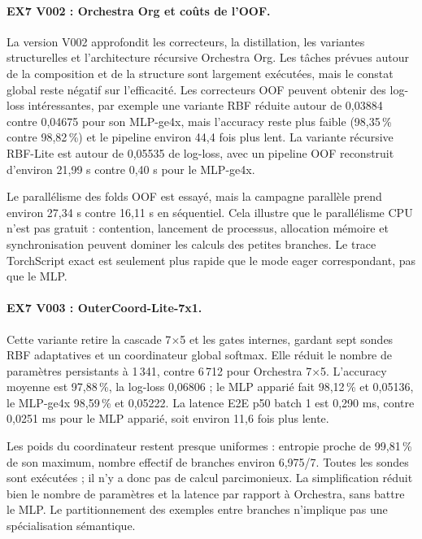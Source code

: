 \documentclass[11pt,a4paper]{article}
\newcommand{\code}[1]{\texttt{\detokenize{#1}}}
\begin{document}
\paragraph{EX7 V002 : Orchestra Org et coûts de l'OOF.} La version V002 approfondit les correcteurs, la distillation, les variantes structurelles et l'architecture récursive Orchestra Org. Les tâches prévues autour de la composition et de la structure sont largement exécutées, mais le constat global reste négatif sur l'efficacité. Les correcteurs OOF peuvent obtenir des log-loss intéressantes, par exemple une variante RBF réduite \code{rbf_d1_k4} autour de 0,03884 contre 0,04675 pour son MLP-ge4x, mais l'accuracy reste plus faible (98,35\,\% contre 98,82\,\%) et le pipeline environ 44,4 fois plus lent. La variante récursive RBF-Lite est autour de 0,05535 de log-loss, avec un pipeline OOF reconstruit d'environ 21,99 s contre 0,40 s pour le MLP-ge4x.

Le parallélisme des folds OOF est essayé, mais la campagne parallèle prend environ 27,34 s contre 16,11 s en séquentiel. Cela illustre que le parallélisme CPU n'est pas gratuit : contention, lancement de processus, allocation mémoire et synchronisation peuvent dominer les calculs des petites branches. Le trace TorchScript exact est seulement plus rapide que le mode eager correspondant, pas que le MLP.

\paragraph{EX7 V003 : OuterCoord-Lite-7x1.} Cette variante retire la cascade 7\(\times\)5 et les gates internes, gardant sept sondes RBF adaptatives et un coordinateur global softmax. Elle réduit le nombre de paramètres persistants à 1\,341, contre 6\,712 pour Orchestra 7\(\times\)5. L'accuracy moyenne est 97,88\,\%, la log-loss 0,06806 ; le MLP apparié fait 98,12\,\% et 0,05136, le MLP-ge4x 98,59\,\% et 0,05222. La latence E2E p50 batch 1 est 0,290 ms, contre 0,0251 ms pour le MLP apparié, soit environ 11,6 fois plus lente.

Les poids du coordinateur restent presque uniformes : entropie proche de 99,81\,\% de son maximum, nombre effectif de branches environ 6,975/7. Toutes les sondes sont exécutées ; il n'y a donc pas de calcul parcimonieux. La simplification réduit bien le nombre de paramètres et la latence par rapport à Orchestra, sans battre le MLP. Le partitionnement des exemples entre branches n'implique pas une spécialisation sémantique.
\end{document}
